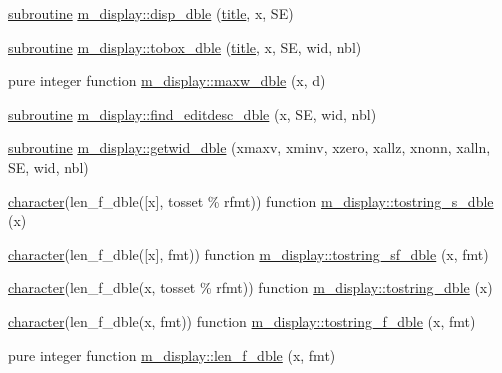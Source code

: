 \begin{DoxyCompactItemize}
\item 
\hyperlink{M__stopwatch_83_8txt_acfbcff50169d691ff02d4a123ed70482}{subroutine} \hyperlink{namespacem__display_a2d67bfdaf90a1173d8283050594c8efa}{m\+\_\+display\+::disp\+\_\+dble} (\hyperlink{print__watch_83_8txt_a15b5bd21156bb9fca6a755ab8c029a9c}{title}, x, SE)
\item 
\hyperlink{M__stopwatch_83_8txt_acfbcff50169d691ff02d4a123ed70482}{subroutine} \hyperlink{namespacem__display_abcff2aedbfe00eb52827b4941af59831}{m\+\_\+display\+::tobox\+\_\+dble} (\hyperlink{print__watch_83_8txt_a15b5bd21156bb9fca6a755ab8c029a9c}{title}, x, SE, wid, nbl)
\item 
pure integer function \hyperlink{namespacem__display_a40bc69658b0fa714777f4b2b5477ee83}{m\+\_\+display\+::maxw\+\_\+dble} (x, d)
\item 
\hyperlink{M__stopwatch_83_8txt_acfbcff50169d691ff02d4a123ed70482}{subroutine} \hyperlink{namespacem__display_a60a64829b11da65ab599a10719eea3cd}{m\+\_\+display\+::find\+\_\+editdesc\+\_\+dble} (x, SE, wid, nbl)
\item 
\hyperlink{M__stopwatch_83_8txt_acfbcff50169d691ff02d4a123ed70482}{subroutine} \hyperlink{namespacem__display_abfcfe1ce55c2ec6aa7a261f6039a19d4}{m\+\_\+display\+::getwid\+\_\+dble} (xmaxv, xminv, xzero, xallz, xnonn, xalln, SE, wid, nbl)
\item 
\hyperlink{option__stopwatch_83_8txt_abd4b21fbbd175834027b5224bfe97e66}{character}(len\+\_\+f\+\_\+dble(\mbox{[}x\mbox{]}, tosset \% rfmt)) function \hyperlink{namespacem__display_ac0c020f1b9556f123bfea3ff29cda048}{m\+\_\+display\+::tostring\+\_\+s\+\_\+dble} (x)
\item 
\hyperlink{option__stopwatch_83_8txt_abd4b21fbbd175834027b5224bfe97e66}{character}(len\+\_\+f\+\_\+dble(\mbox{[}x\mbox{]}, fmt)) function \hyperlink{namespacem__display_a41a473fe1569b4f3b44cc3f9b1f5b1ce}{m\+\_\+display\+::tostring\+\_\+sf\+\_\+dble} (x, fmt)
\item 
\hyperlink{option__stopwatch_83_8txt_abd4b21fbbd175834027b5224bfe97e66}{character}(len\+\_\+f\+\_\+dble(x, tosset \% rfmt)) function \hyperlink{namespacem__display_a0b5ebf70cd08a5bffc132707049bcef6}{m\+\_\+display\+::tostring\+\_\+dble} (x)
\item 
\hyperlink{option__stopwatch_83_8txt_abd4b21fbbd175834027b5224bfe97e66}{character}(len\+\_\+f\+\_\+dble(x, fmt)) function \hyperlink{namespacem__display_af82ac5edf2d812767205ea93974885d6}{m\+\_\+display\+::tostring\+\_\+f\+\_\+dble} (x, fmt)
\item 
pure integer function \hyperlink{namespacem__display_aa013a639d5b0f7e40b627c9d712693f0}{m\+\_\+display\+::len\+\_\+f\+\_\+dble} (x, fmt)

\end{DoxyCompactItemize}
